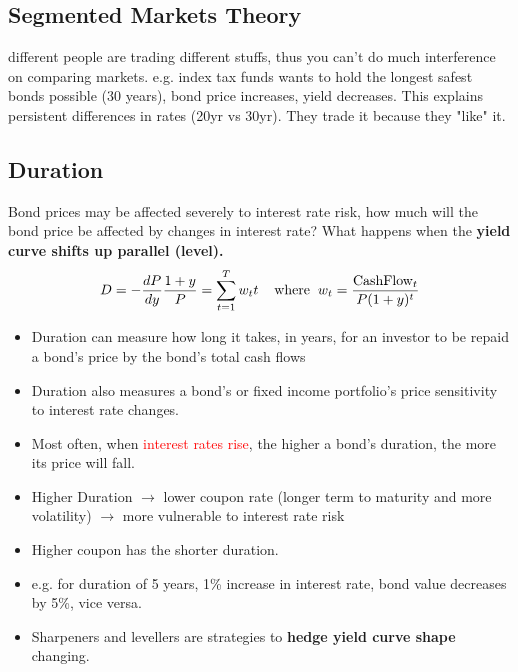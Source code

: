 \begin{multicols}{2}
\subsection{Segmented Markets Theory}
different people are trading different stuffs, thus you can't do much interference on comparing markets. e.g. index tax funds wants to hold the longest safest bonds possible (30 years), bond price increases, yield decreases. This explains persistent differences in rates (20yr vs 30yr). They trade it because they "like" it.

\subsection{Duration}
Bond prices may be affected severely to interest rate risk, how much will the bond price be affected by changes in interest rate? What happens when the \textbf{yield curve shifts up parallel (level).}
\begin{gather*}
    D = -\frac{dP}{dy}\frac{1+y}{P} = \sum_{t=1}^{T}w_tt\hspace*{0.4cm}\text{where}\hspace*{0.2cm}w_t = \frac{\text{CashFlow}_t}{P(1+y)^t}
\end{gather*}
\begin{itemize}
    \item Duration can measure how long it takes, in years, for an investor to be repaid a bond's price by the bond's total cash flows
    \item Duration also measures a bond's or fixed income portfolio's price sensitivity to interest rate changes.
    \item Most often, when \textcolor{red}{interest rates rise}, the higher a bond's duration, the more its price will fall.
    \item Higher Duration $\rightarrow$ lower coupon rate (longer term to maturity and more volatility) $\rightarrow$ more vulnerable to interest rate risk
    \item Higher coupon has the shorter duration. 
    \item e.g. for duration of 5 years, 1\% increase in interest rate, bond value decreases by 5\%, vice versa.
    \item Sharpeners and levellers are strategies to \textbf{hedge yield curve shape} changing. 
\end{itemize}


\end{multicols}